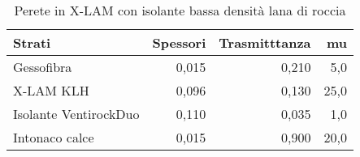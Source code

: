 \begin{table}
\centering
\caption{Perete in X-LAM con isolante bassa densità lana di roccia}
\begin{tabular}{lrrr}
\toprule
                Strati & Spessori & Trasmitttanza &    mu \\
\midrule
            Gessofibra &    0,015 &         0,210 &   5,0 \\
             X-LAM KLH &    0,096 &         0,130 &  25,0 \\
 Isolante VentirockDuo &    0,110 &         0,035 &   1,0 \\
        Intonaco calce &    0,015 &         0,900 &  20,0 \\
\bottomrule
\end{tabular}
\end{table}
